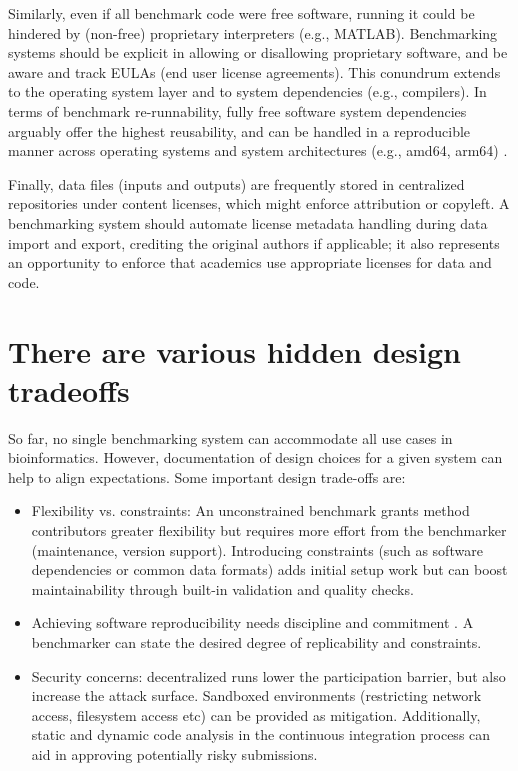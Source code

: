 \documentclass[11pt]{article}
\begin{document}

Similarly, even if all benchmark code were free software, running it could be hindered by (non-free) proprietary interpreters (e.g., MATLAB). Benchmarking systems should be explicit in allowing or disallowing proprietary software, and be aware and track EULAs (end user license agreements). This conundrum extends to the operating system layer and to system dependencies (e.g., compilers). In terms of benchmark re-runnability, fully free software system dependencies arguably offer the highest reusability, and can be handled in a reproducible manner across operating systems and system architectures (e.g., amd64, arm64) \cite{Droge2023-ax}.

Finally, data files (inputs and outputs) are frequently stored in centralized repositories \cite{Potter2015-fs, Sicilia2017-ko, van-de-Sandt2019-wd} under content licenses, which might enforce attribution or copyleft. A benchmarking system should automate license metadata handling during data import and export, crediting the original authors if applicable; it also represents an opportunity to enforce that academics use appropriate licenses for data and code. 


\section*{There are various hidden design tradeoffs}

So far, no single benchmarking system can accommodate all use cases in bioinformatics. However, documentation of design choices for a given system can help to align expectations. Some important design trade-offs are:

\begin{itemize}
    \item Flexibility vs. constraints:  An unconstrained benchmark grants method contributors greater flexibility but requires more effort from the benchmarker (maintenance, version support). Introducing constraints (such as software dependencies or common data formats) adds initial setup work but can boost maintainability through built-in validation and quality checks.
    \item  Achieving software reproducibility needs discipline and commitment \cite{Lamb2021-tb}. A benchmarker can state the desired degree of replicability and constraints. 
    \item  Security concerns: decentralized runs lower the participation barrier, but also increase the attack  surface. Sandboxed environments (restricting network access, filesystem access etc) can be provided as mitigation. Additionally, static and dynamic code analysis in the continuous integration process can aid in approving potentially risky submissions.
\end{itemize}
\end{document}
